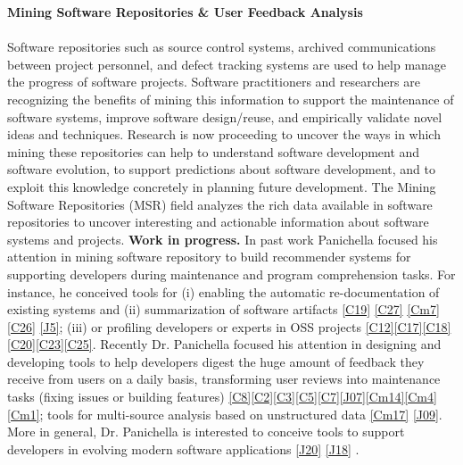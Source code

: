 \documentclass[10pt]{article}
\newcommand{\blankline}{\quad\pagebreak[3]}
\begin{document}
\textbf{Mining Software Repositories \& User Feedback Analysis}
\blankline \\\\
Software repositories such as source control systems, archived communications between project personnel, and defect tracking systems are used to help manage the progress of software projects. Software practitioners and researchers are recognizing the benefits of mining this information to support the maintenance of software systems, improve software design/reuse, and empirically validate novel ideas and techniques. Research is now proceeding to uncover the ways in which mining these repositories can help to understand software development and software evolution, to support predictions about software development, and to exploit this knowledge concretely in planning future development. The Mining Software Repositories (MSR) field analyzes the rich data available in software repositories to uncover interesting and actionable information about software systems and projects.
   \textbf{Work in progress.}  In past work Panichella focused his attention in mining software repository to build recommender systems for supporting developers during maintenance and program comprehension tasks. For instance, he conceived tools for  (i) enabling the automatic re-documentation of existing systems and (ii) summarization of software artifacts \ref{C19} \ref{C27} \ref{Cm7} \ref{C26} \ref{J5};  (iii) or profiling developers or experts in OSS projects \ref{C12}\ref{C17}\ref{C18}\ref{C20}\ref{C23}\ref{C25}. 
   Recently Dr. Panichella  focused his attention in designing and developing tools to help  developers digest the huge amount of feedback they receive from users on a daily basis, transforming user reviews into maintenance tasks (fixing issues or building features) \ref{C8}\ref{C2}\ref{C3}\ref{C5}\ref{C7}\ref{J07}\ref{Cm14}\ref{Cm4}\ref{Cm1}; tools  for multi-source analysis based on unstructured data \ref{Cm17} \ref{J09}.     
   More in general, Dr. Panichella is interested to conceive tools to support developers in evolving modern software applications  \ref{J20} \ref{J18}
. \\
   
\end{document}
